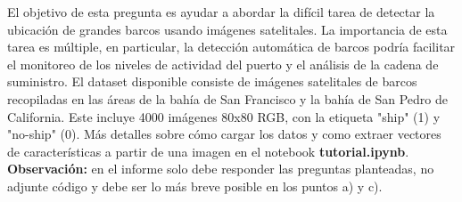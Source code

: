 \documentclass[11pt,letterpaper]{article}
\begin{document}
 El objetivo de esta pregunta es ayudar a abordar la difícil tarea de detectar la ubicación de grandes barcos usando imágenes satelitales. La importancia de esta tarea es múltiple, en particular, la detección automática de barcos podría facilitar el monitoreo de los niveles de actividad del puerto y el análisis de la cadena de suministro. El dataset disponible consiste de imágenes satelitales de barcos recopiladas en las áreas de la bahía de San Francisco y la bahía de San Pedro de California.  Este incluye 4000 imágenes 80x80 RGB, con la etiqueta "ship" (1) y "no-ship" (0). Más detalles sobre cómo cargar los datos y como extraer vectores de características a partir de una imagen en el notebook \textbf{tutorial.ipynb}. \textbf{Observación:} en el informe solo debe responder las preguntas planteadas, no adjunte código y debe ser lo más breve posible en los puntos a) y c).
\end{document}
